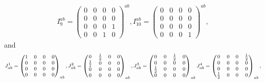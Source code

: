 \begin{equation}
\begin{gathered}
  I^{ab}_9 = \begin{pmatrix}0 & 0 & 0 & 0 \\ 0 & 0 & 0 & 0 \\ 0 & 0 & 0 & 1 \\ 0 & 0 & 1 & 0\end{pmatrix}^{ab}, I^{ab}_{10} = \begin{pmatrix}0 & 0 & 0 & 0 \\ 0 & 0 & 0 & 0 \\ 0 & 0 & 0 & 0 \\ 0 & 0 & 0 & 1\end{pmatrix}^{ab},
  \end{gathered}
\end{equation}
and
\begin{equation}
  \footnotesize
  \begin{gathered}
    J_{ab}^1 = \begin{pmatrix}1 & 0 & 0 & 0 \\ 0 & 0 & 0 & 0 \\ 0 & 0 & 0 & 0 \\ 0 & 0 & 0 & 0\end{pmatrix}_{ab}, J_{ab}^2 = \begin{pmatrix}0 & \frac{1}{2} & 0 & 0 \\ \frac{1}{2} & 0 & 0 & 0 \\ 0 & 0 & 0 & 0 \\ 0 & 0 & 0 & 0\end{pmatrix}_{ab}, J_{ab}^3 = \begin{pmatrix}0 & 0 & \frac{1}{2} & 0 \\ 0 & 0 & 0 & 0 \\ \frac{1}{2} & 0 & 0 & 0 \\ 0 & 0 & 0 & 0\end{pmatrix}_{ab} J_{ab}^4 = \begin{pmatrix}0 & 0 & 0 & \frac{1}{2} \\ 0 & 0 & 0 & 0 \\ 0 & 0 & 0 & 0 \\ \frac{1}{2} & 0 & 0 & 0\end{pmatrix}_{ab}, \\

\end{gathered}
\end{equation}
